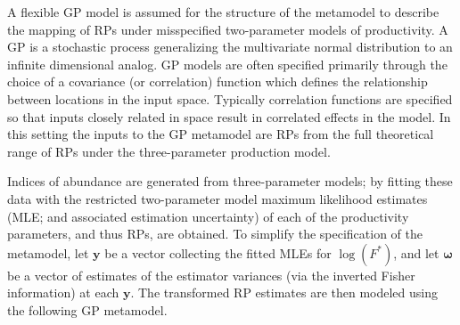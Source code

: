 %
A flexible GP model is assumed for the structure of the metamodel to describe 
the mapping of RPs under misspecified two-parameter models of productivity. A 
GP is a stochastic process generalizing the multivariate normal distribution to 
an infinite dimensional analog. GP models are often specified primarily
through the choice of a covariance (or correlation) function which defines the
relationship between locations in the input space. %
Typically correlation functions are specified so that inputs closely related in
space result in correlated effects in the model. In this setting the inputs to
the GP metamodel are RPs from the full theoretical range of RPs under the 
three-parameter production model. 

%
{\color{blue} %
Indices of abundance are generated from three-parameter models; by
fitting these data with the restricted two-parameter model maximum likelihood estimates (MLE; and associated estimation
uncertainty) of each of the productivity parameters, and thus RPs, are obtained. 
%
%
%
%
To simplify the specification of the metamodel, let $\textbf{y}$ be a vector
collecting the fitted MLEs for $\log(F^*)$, and let %
$\bm{\omega}$ be a vector of estimates of the estimator variances (via the
inverted Fisher information) at each $\textbf{y}$.
%
The transformed RP estimates are then modeled using the following GP metamodel. %
}

